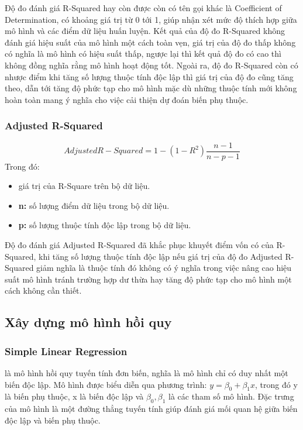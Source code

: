 \documentclass[runningheads]{llncs}
\begin{document}
Độ đo đánh giá R-Squared hay còn được còn có tên gọi khác là Coefficient of Determination, có khoảng giá trị từ 0 tới 1, giúp nhận xét mức độ thích hợp giữa mô hình và các điểm dữ liệu huấn luyện. Kết quả của độ đo R-Squared không đánh giá hiệu suất của mô hình một cách toàn vẹn, giá trị của độ đo thấp không có nghĩa là mô hình có hiệu suất thấp, ngược lại thì kết quả độ đo có cao thì không đồng nghĩa rằng mô hình hoạt động tốt. Ngoài ra, độ đo R-Squared còn có nhược điểm khi tăng số lượng thuộc tính độc lập thì giá trị của độ đo cũng tăng theo, dẫn tới tăng độ phức tạp cho mô hình mặc dù những thuộc tính mới không hoàn toàn mang ý nghĩa cho việc cải thiện dự đoán biến phụ thuộc.

\subsubsection{Adjusted R-Squared}
\begin{equation}
	Adjusted  R-Squared = 1- (1-R^2)\frac{n-1}{n-p-1}
\end{equation}
Trong đó: \\
\begin{itemize}
	\item {} giá trị của R-Square trên bộ dữ liệu.\\
	\item \textbf{n:} số lượng điểm dữ liệu trong bộ dữ liệu.\\
	\item \textbf{p:} số lượng thuộc tính độc lập trong bộ dữ liệu.\\
\end{itemize}

 Độ đo đánh giá Adjusted R-Squared đã khắc phục khuyết điểm vốn có của R-Squared, khi tăng số lượng thuộc tính độc lập nếu giá trị của độ đo Adjusted R-Squared giảm nghĩa là thuộc tính đó không có ý nghĩa trong việc nâng cao hiệu suất mô hình tránh trường hợp dư thừa hay tăng độ phức tạp cho mô hình một cách không cần thiết.


\subsection{Xây dựng mô hình hồi quy}

\subsubsection{Simple Linear Regression}
là mô hình hồi quy tuyến tính đơn biến, nghĩa là mô hình chỉ có duy nhất một biến độc lập. Mô hình được biểu diễn qua phương trình: $y= \beta_0 +\beta_1x$, trong đó y là biến phụ thuộc, x là biến độc lập và $\beta_0, \beta_1$ là các tham số mô hình. Đặc trưng của mô hình là một đường thẳng tuyến tính giúp đánh giá mối quan hệ giữa biến độc lập và biến phụ thuộc. 
\end{document}
